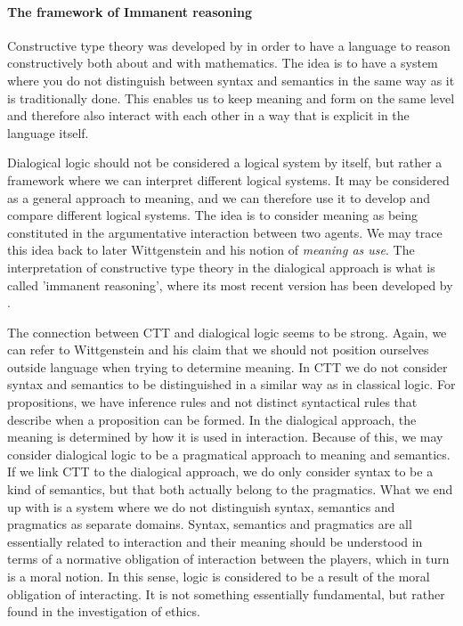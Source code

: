         \paragraph{The framework of Immanent reasoning}
    
    		Constructive type theory was developed by \textcite{martin1984intuitionistic} in order to have a language to reason constructively both about and with mathematics. The idea is to have a system where you do not distinguish between syntax and semantics in the same way as it is traditionally done. This enables us to keep meaning and form on the same level and therefore also interact with each other in a way that is explicit in the language itself. 
        
        	Dialogical logic should not be considered a logical system by itself, but rather a framework where we can interpret different logical systems. It may be considered as a general approach to meaning, and we can therefore use it to develop and compare different logical systems. The idea is to consider meaning as being constituted in the argumentative interaction between two agents. We may trace this idea back to later Wittgenstein and his notion of \textit{meaning as use}. The interpretation of constructive type theory in the dialogical approach is what is called 'immanent reasoning', where its most recent version has been developed by \textcite{rahman18}.
    
        	The connection between CTT and dialogical logic seems to be strong. Again, we can refer to Wittgenstein and his claim that we should not position ourselves outside language when trying to determine meaning. In CTT we do not consider syntax and semantics to be distinguished in a similar way as in classical logic. For propositions, we have inference rules and not distinct syntactical rules that describe when a proposition can be formed. In the dialogical approach, the meaning is determined by how it is used in interaction. Because of this, we may consider dialogical logic to be a pragmatical approach to meaning and semantics. If we link CTT to the dialogical approach, we do only consider syntax to be a kind of semantics, but that both actually belong to the pragmatics. What we end up with is a system where we do not distinguish syntax, semantics and pragmatics as separate domains. Syntax, semantics and pragmatics are all essentially related to interaction and their meaning should be understood in terms of a normative obligation of interaction between the players, which in turn is a moral notion. In this sense, logic is considered to be a result of the moral obligation of interacting. It is not something essentially fundamental, but rather found in the investigation of ethics. 
    
